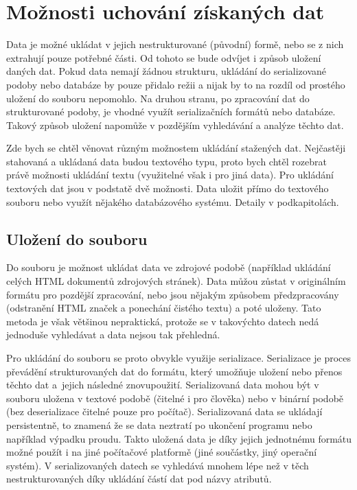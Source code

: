 \section{Možnosti uchování získaných dat}
\label{ukladani}
Data je možné ukládat v jejich nestrukturované (původní) formě, nebo se z nich extrahují pouze potřebné části. Od tohoto se bude odvíjet i způsob uložení daných dat. Pokud data nemají žádnou strukturu, ukládání do serializované podoby nebo databáze by pouze přidalo režii a nijak by to na rozdíl od prostého uložení do souboru nepomohlo.
Na druhou stranu, po zpracování dat do strukturované podoby, je vhodné využít serializačních formátů nebo databáze. Takový způsob uložení napomůže v pozdějším vyhledávání a analýze těchto dat.

Zde bych se chtěl věnovat různým možnostem ukládání stažených dat. Nejčastěji stahovaná a ukládaná data budou textového typu, proto bych chtěl rozebrat právě možnosti ukládání textu (využitelné však i pro jiná data).
Pro ukládání textových dat jsou v podstatě dvě možnosti. Data uložit přímo do textového souboru nebo využít nějakého databázového systému. Detaily v podkapitolách.


\subsection{Uložení do souboru}
Do souboru je možnost ukládat data ve zdrojové podobě (například ukládání celých HTML dokumentů zdrojových stránek). Data můžou zůstat v originálním formátu pro pozdější zpracování, nebo jsou nějakým způsobem předzpracovány (odstranění HTML značek a ponechání čistého textu) a poté uloženy. Tato metoda je však většinou nepraktická, protože se v takovýchto datech nedá jednoduše vyhledávat a data nejsou tak přehledná.

Pro ukládání do souboru se proto obvykle využije serializace. 
Serializace je proces převádění strukturovaných dat do formátu, který umožňuje uložení nebo přenos těchto dat a~jejich následné znovupoužití. Serializovaná data mohou být v souboru uložena v textové podobě (čitelné i pro člověka) nebo v binární podobě (bez deserializace čitelné pouze pro počítač). Serializovaná data se ukládají persistentně, to znamená že se data neztratí po ukončení programu nebo například výpadku proudu. Takto uložená data je díky jejich jednotnému formátu možné použít i na jiné počítačové platformě (jiné součástky, jiný operační systém).
V serializovaných datech se vyhledává mnohem lépe než v těch nestrukturovaných díky ukládání částí dat pod názvy atributů. 


